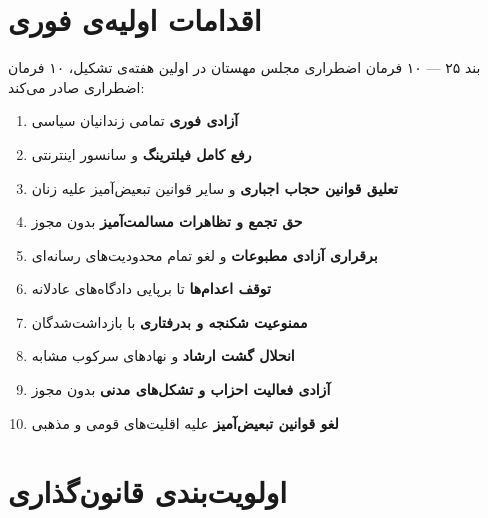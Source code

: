 \begin{center}
{
	}%
\end{center}
\vspace{0.5\baselineskip}

\section{اقدامات اولیه‌ی فوری}

\begin{bandbox}{بند ۲۵ --- ۱۰ فرمان اضطراری}
	مجلس مهستان در اولین هفته‌ی تشکیل، ۱۰ فرمان اضطراری صادر می‌کند:
	
	\begin{enumerate}
		\item \textbf{آزادی فوری} تمامی زندانیان سیاسی
		\item \textbf{رفع کامل فیلترینگ} و سانسور اینترنتی
		\item \textbf{تعلیق قوانین حجاب اجباری} و سایر قوانین تبعیض‌آمیز علیه زنان
		\item \textbf{حق تجمع و تظاهرات مسالمت‌آمیز} بدون مجوز
		\item \textbf{برقراری آزادی مطبوعات} و لغو تمام محدودیت‌های رسانه‌ای
		\item \textbf{توقف اعدام‌ها} تا برپایی دادگاه‌های عادلانه
		\item \textbf{ممنوعیت شکنجه و بدرفتاری} با بازداشت‌شدگان
		\item \textbf{انحلال گشت ارشاد} و نهادهای سرکوب مشابه
		\item \textbf{آزادی فعالیت احزاب و تشکل‌های مدنی} بدون مجوز
		\item \textbf{لغو قوانین تبعیض‌آمیز} علیه اقلیت‌های قومی و مذهبی
	\end{enumerate}
\end{bandbox}

\section{اولویت‌بندی قانون‌گذاری}

